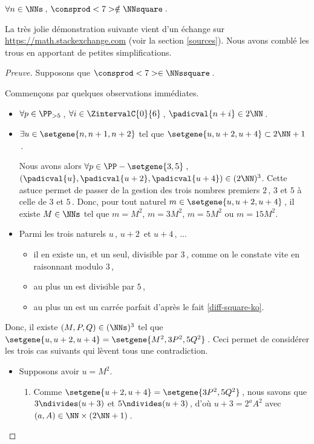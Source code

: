 \begin{fact} \label{case-7}
	 $\forall n \in \NNs$\,, $\consprod<7> \notin \NNsquare$\,.
\end{fact}




La très jolie démonstration suivante vient d'un échange sur \url{https://math.stackexchange.com} (voir la section \ref{sources}). Nous avons comblé les trous en apportant de petites simplifications.
	

\begin{proof}[Preuve]
	Supposons que $\consprod<7> \in \NNssquare$\,.
	
	\smallskip
	
	Commençons par quelques observations immédiates.
    \begin{itemize}
    	\item  
		$\forall p \in \PP_{>5}$\,, 
   		$\forall i \in \ZintervalC{0}{6}$\,, 
    	$\padicval{n + i} \in 2 \NN$\,.
	
	
		\item $\exists u \in \setgene{n, n+1, n+2}$ tel que $\setgene{u, u + 2, u + 4} \subset 2 \NN + 1$\,.
		
		\noindent
		Nous avons alors
		$\forall p \in \PP - \setgene{3, 5}$\,, 
   		$(\padicval{u}, \padicval{u+2}, \padicval{u+4}) \in ( 2 \NN )^3$.
		Cette astuce permet de passer de la gestion des trois nombres premiers $2$\,, $3$ et $5$ à celle de $3$ et $5$\,.
		Donc, pour tout naturel $m \in \setgene{u, u + 2, u + 4}$\,, 
		il existe $M \in \NNs$ tel que 
		$m = M^2$, $m = 3 M^2$, $m = 5 M^2$ ou $m = 15 M^2$.
	
	
		\item Parmi les trois naturels $u$\,, $u + 2$\, et $u + 4$\,, ...
		\begin{itemize}
    		\item il en existe un, et un seul, divisible par $3$\,, comme on le constate vite en raisonnant modulo $3$\,,

    		\item au plus un est divisible par $5$\,,

    		\item au plus un est un carrée parfait d'après le fait \ref{diff-square-ko}.
		\end{itemize}
    \end{itemize}

    \smallskip
	
	Donc, il existe $(M, P, Q) \in ( \NNs )^3$ tel que 
    $\setgene{u, u + 2, u + 4} = \setgene{M^2, 3P^2, 5Q^2}$\,.
    Ceci permet de considérer les trois cas suivants qui lèvent tous une contradiction.
    \begin{itemize}
    	\item Supposons avoir $u = M^2$.
		\begin{enumerate}
			\item Comme $\setgene{u + 2, u + 4} = \setgene{3P^2, 5Q^2}$\,, nous savons que $3 \ndivides (u + 3)$ et $5 \ndivides (u + 3)$\,, d'où $u + 3 = 2^a A^2$ avec $(a, A) \in \NN \times (2\NN + 1)$\,.


\end{enumerate}
\end{itemize}
\end{proof}
